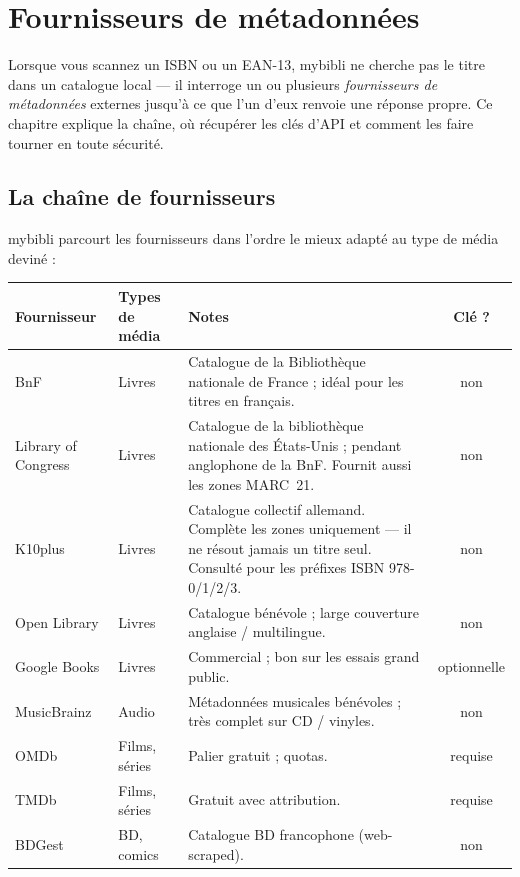 \chapter{Fournisseurs de métadonnées}
\label{ch:providers}

Lorsque vous scannez un ISBN ou un EAN-13, mybibli ne cherche pas le
titre dans un catalogue local — il interroge un ou plusieurs
\emph{fournisseurs de métadonnées}
externes jusqu'à ce que l'un d'eux renvoie une réponse propre. Ce
chapitre explique la chaîne, où récupérer les clés d'API et comment
les faire tourner en toute sécurité.

\section{La chaîne de fournisseurs}

mybibli parcourt les fournisseurs dans l'ordre le mieux adapté au
type de média deviné :

\begin{longtable}{@{} l l p{4.5cm} c @{}}
\toprule
\textbf{Fournisseur} & \textbf{Types de média} & \textbf{Notes} & \textbf{Clé ?} \\
\midrule
\endhead
BnF\index{BnF}                  & Livres         & Catalogue de la
Bibliothèque nationale de France ; idéal pour les titres en français. & non \\
Library of Congress\index{Library of Congress} & Livres & Catalogue
de la bibliothèque nationale des États-Unis ; pendant anglophone de
la BnF. Fournit aussi les zones MARC~21. & non \\
K10plus\index{K10plus}          & Livres         & Catalogue
collectif allemand. Complète les zones uniquement — il ne résout
jamais un titre seul. Consulté pour les préfixes ISBN 978-0/1/2/3. & non \\
Open Library\index{Open Library} & Livres         & Catalogue
bénévole ; large couverture anglaise / multilingue. & non \\
Google Books\index{Google Books} & Livres         & Commercial ; bon
sur les essais grand public. & optionnelle \\
MusicBrainz\index{MusicBrainz}  & Audio          & Métadonnées musicales
bénévoles ; très complet sur CD / vinyles. & non \\
OMDb\index{OMDb}                & Films, séries  & Palier gratuit ; quotas. & requise \\
TMDb\index{TMDb}                & Films, séries  & Gratuit avec attribution. & requise \\
BDGest\index{BDGest}            & BD, comics     & Catalogue BD
francophone (web-scraped). & non \\
\bottomrule
\end{longtable}

